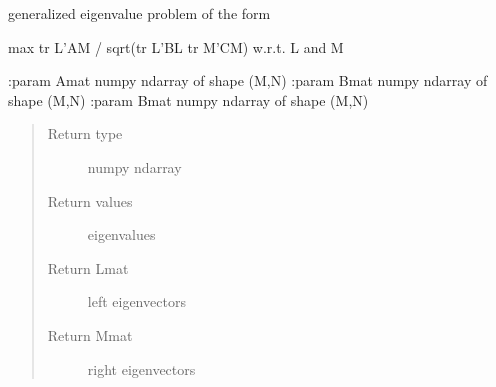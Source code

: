 \documentclass[letterpaper,10pt,english]{sphinxmanual}
\begin{document}

\begin{fulllineitems}
\label{utility_functions:utility_functions.geigen}
generalized eigenvalue problem of the form

max tr L'AM / sqrt(tr L'BL tr M'CM) w.r.t. L and M

:param Amat numpy ndarray of shape (M,N)
:param Bmat numpy ndarray of shape (M,N)
:param Bmat numpy ndarray of shape (M,N)
\begin{quote}\begin{description}
\item[{Return type}] \leavevmode
numpy ndarray

\item[{Return values}] \leavevmode
eigenvalues

\item[{Return Lmat}] \leavevmode
left eigenvectors

\item[{Return Mmat}] \leavevmode
right eigenvectors

\end{description}\end{quote}

\end{fulllineitems}

\end{document}
